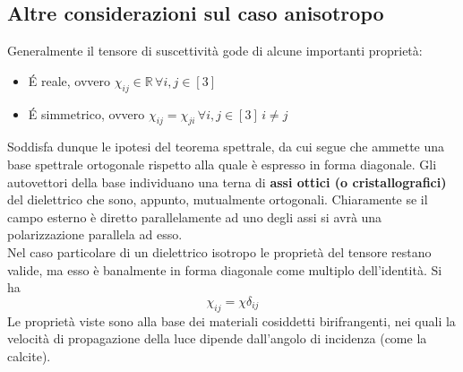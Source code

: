 \subsection{Altre considerazioni sul caso anisotropo}
Generalmente il tensore di suscettività gode di alcune importanti proprietà:
\begin{itemize}
\item \'E reale, ovvero $\chi_{ij} \in \mathbb{R} \, \forall i,j \in [3]$
\item \'E simmetrico, ovvero $\chi_{ij} = \chi_{ji} \, \forall i,j \in [3] \, i \neq j$
\end{itemize}
Soddisfa dunque le ipotesi del teorema spettrale, da cui segue che ammette una base spettrale ortogonale rispetto alla quale è espresso in forma diagonale. Gli autovettori della base individuano una terna di \textbf{assi ottici (o cristallografici)} del dielettrico che sono, appunto, mutualmente ortogonali. Chiaramente se il campo esterno è diretto parallelamente ad uno degli assi si avrà una polarizzazione parallela ad esso.
\\Nel caso particolare di un dielettrico isotropo le proprietà del tensore restano valide, ma esso è banalmente in forma diagonale come multiplo dell'identità. Si ha 
\[\chi_{ij} = \chi \delta_{ij}\]
Le proprietà viste sono alla base dei materiali cosiddetti birifrangenti, nei quali la velocità di propagazione della luce dipende dall'angolo di incidenza (come la calcite).

